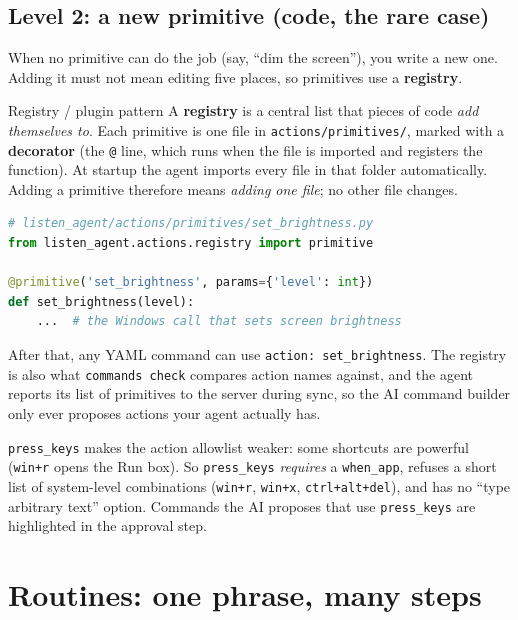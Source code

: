 \documentclass[11pt,a4paper]{article}
\begin{document}
\subsection{Level 2: a new primitive (code, the rare case)}

When no primitive can do the job (say, ``dim the screen''), you write a new one. Adding it must
not mean editing five places, so primitives use a \textbf{registry}.

\begin{concept}{Registry / plugin pattern}
A \textbf{registry} is a central list that pieces of code \emph{add themselves to}. Each
primitive is one file in \texttt{actions/primitives/}, marked with a \textbf{decorator}
(the \texttt{@} line, which runs when the file is imported and registers the function). At
startup the agent imports every file in that folder automatically. Adding a primitive therefore
means \emph{adding one file}; no other file changes.
\end{concept}

\begin{lstlisting}[language=Python]
# listen_agent/actions/primitives/set_brightness.py
from listen_agent.actions.registry import primitive

@primitive('set_brightness', params={'level': int})
def set_brightness(level):
    ...  # the Windows call that sets screen brightness
\end{lstlisting}

\noindent After that, any YAML command can use \texttt{action: set\_brightness}. The registry
is also what \texttt{commands check} compares action names against, and the agent reports its
list of primitives to the server during sync, so the AI command builder only ever proposes
actions your agent actually has.

\begin{caution}
\texttt{press\_keys} makes the action allowlist weaker: some shortcuts are powerful
(\texttt{win+r} opens the Run box). So \texttt{press\_keys} \emph{requires} a
\texttt{when\_app}, refuses a short list of system-level combinations (\texttt{win+r},
\texttt{win+x}, \texttt{ctrl+alt+del}), and has no ``type arbitrary text'' option. Commands the
AI proposes that use \texttt{press\_keys} are highlighted in the approval step.
\end{caution}

\section{Routines: one phrase, many steps}\label{sec:routines}
\end{document}
